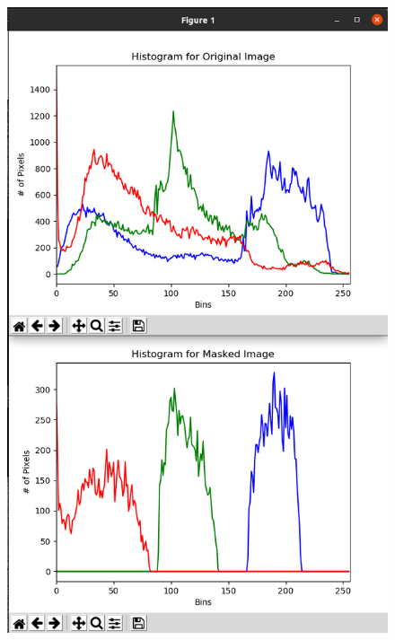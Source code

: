 \documentclass[12pt,letterpaper]{article}
\begin{document}
\begin{multicols}{2}
\begin{figure}[H]
\centering
\includegraphics[width = \columnwidth]{Resultado1_ch7_4.png}
\end{figure} 



\end{multicols}
\end{document}
